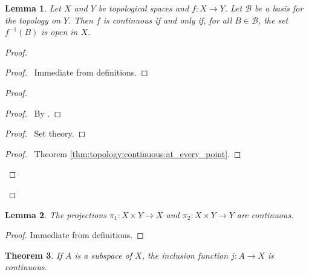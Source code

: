 \documentclass{report}
\let\qed\relax
\newtheorem{lm}{Lemma}[section]
\newtheorem{thm}[lm]{Theorem}
\theoremstyle{definition}
\begin{document}
  \begin{lm}
    \label{lm:topology:continuous:basis}
    Let $X$ and $Y$ be topological spaces and $f : X \rightarrow Y$. Let
    $\mathcal{B}$ be a basis for the topology on $Y$. Then $f$ is continuous if
    and only if, for all $B \in \mathcal{B}$, the set $f^{-1}(B)$ is open in
    $X$.
  \end{lm}

  \begin{proof}
    \pf
    \begin{proof}
      \pf\ Immediate from definitions.
    \end{proof}
    \begin{proof}
      \begin{proof}
        \pf\ By .
      \end{proof}
      \begin{proof}
        \pf\ Set theory.
      \end{proof}
      \qedstep
      \begin{proof}
        \pf\ Theorem \ref{thm:topology:continuous:at_every_point}.
      \end{proof}
    \end{proof}
    \qed
  \end{proof}

  \begin{lm}
    \label{lm:topology:continuous:projections}
    The projections $\pi_1 : X \times Y \rightarrow X$ and $\pi_2 : X \times Y
    \rightarrow Y$ are continuous.
  \end{lm}

  \begin{proof}
    \pf Immediate from definitions. \qed
  \end{proof}

  \begin{thm}
    If $A$ is a subspace of $X$, the inclusion function $j : A \rightarrow
    X$
    is
    continuous.
  \end{thm}
\end{document}
